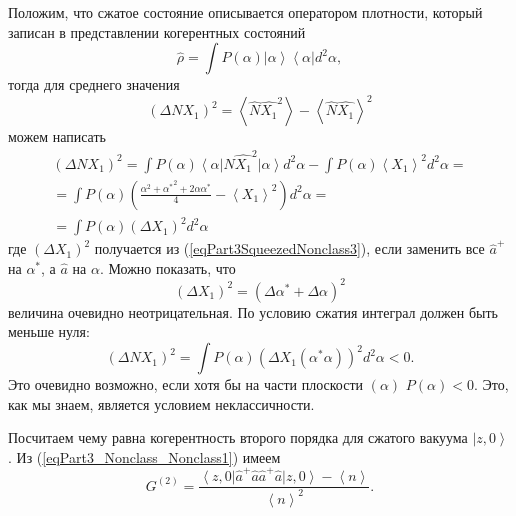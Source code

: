 Положим, что сжатое состояние описывается оператором плотности,
который записан в представлении когерентных состояний
\[
\hat{\rho} = \int P\left(\alpha\right)
\left|\alpha\right>
\left<\alpha\right| d^2 \alpha,
\]
тогда для среднего значения 
\begin{equation}
\left(\Delta N X_1\right)^2 = 
\left<\hat{N} \hat{X_1}^2\right> - \left<\hat{N} \hat{X_1}\right>^2 
\label{eqPart3SqueezedNonclass3}
\end{equation}
можем написать
\begin{eqnarray}
  \left(\Delta N X_1\right)^2 =
  \int P\left(\alpha\right)
  \left<\alpha\right|
  \hat{N} \hat{X_1}^2
  \left|\alpha\right> d^2 \alpha -
  \int P\left(\alpha\right)
  \left< X_1 \right>^2
  d^2 \alpha
  =
  \nonumber \\
  =
  \int  
  P\left(\alpha\right)
  \left(
  \frac{
    \alpha^2 + {\alpha^\ast}^2 +
    2 \alpha \alpha^\ast}{4}
  - \left< X_1 \right>^2
  \right)
   d^2 \alpha
  =
  \nonumber \\
  =
 \int 
P\left(\alpha\right)
\left(\Delta X_1\right)^2
d^2 \alpha
\end{eqnarray}
где $\left(\Delta X_1\right)^2$ получается из
(\ref{eqPart3SqueezedNonclass3}), если заменить все $\hat{a}^{+}$ на
$\alpha^{*}$, а $\hat{a}$ на $\alpha$. Можно показать, что
\[
\left(\Delta X_1\right)^2 = \left(\Delta \alpha^{*} + \Delta \alpha\right)^2
\]
величина очевидно неотрицательная. По условию сжатия интеграл должен
быть меньше нуля:
\begin{equation}
\left(\Delta N X_1\right)^2 = 
 \int 
P\left(\alpha\right)
\left(\Delta X_1\left(\alpha^{*}\alpha\right)\right)^2
d^2 \alpha < 0.
\nonumber
\end{equation}
Это очевидно возможно, если хотя бы на части плоскости
$\left(\alpha\right)$ $P\left(\alpha\right) < 0$. Это, как мы знаем,
является условием неклассичности. 

Посчитаем чему равна когерентность второго порядка для сжатого вакуума
$\left|z, 0\right>$. Из (\ref{eqPart3_Nonclass_Nonclass1}) имеем
\[
G^{(2)} = \frac{\left<z,0\right|\hat{a}^{+}\hat{a}\hat{a}^{+}\hat{a}\left|z,0\right>
- \left<n\right>}{\left<n\right>^2}.
\]

